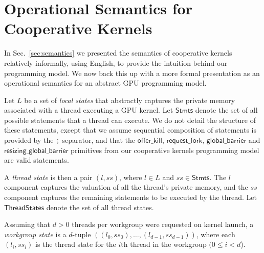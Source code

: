 \documentclass[sigconf]{acmart}
\newcommand{\mysec}{Sec.~}
\newcommand{\code}[1]{\lstset{basicstyle=\tt}\lstinline!#1!\lstset{basicstyle=\scriptsize\tt}}
\newcommand{\offerfork}{\mathsf{request\_fork}}
\newcommand{\offerkill}{\mathsf{offer\_kill}}
\newcommand{\globalbarrier}{\mathsf{global\_barrier}}
\newcommand{\resizingglobalbarrier}{\mathsf{resizing\_global\_barrier}}
\begin{document}
{%

\clearpage




\iffalse


\clearpage

\appendix

\section{Operational Semantics for Cooperative Kernels}\label{appendix:semantics}

\newcommand{\myss}{\mathit{ss}}
\newcommand{\Stmts}{\mathsf{Stmts}}
\newcommand{\threadstates}{\mathsf{ThreadStates}}
\newcommand{\sharedstates}{\mathsf{SharedStates}}
\newcommand{\sync}{\mathsf{sync}}

In \mysec\ref{sec:semantics} we presented the semantics of cooperative
kernels relatively informally, using English, to provide the intuition
behind our programming model.  We now back this up with a more formal
presentation as an operational semantics for an abstract GPU
programming model.

%
Let $L$ be a set of \emph{local states} that abstractly captures the
private memory associated with a thread executing a GPU kernel.  Let
$\Stmts$ denote the set of all possible statements that a
thread can execute.  We do not detail the structure of these
statements, except that we assume sequential composition of statements
is provided by the $\code{;}$ separator, and that the $\offerkill$,
$\offerfork$, $\globalbarrier$ and $\resizingglobalbarrier$ primitives
from our cooperative kernels programming model are valid statements.

A \emph{thread state} is then a pair $(l, \myss)$, where $l \in L$ and
$\myss \in \Stmts$.  The $l$ component captures the valuation of all the
thread's private memory, and the $\myss$ component captures the
remaining statements to be executed by the thread.  Let $\threadstates$ denote the set of all thread states.

Assuming that $d > 0$ threads per workgroup were requested on kernel launch, a \emph{workgroup state}
is a $d$-tuple $((l_0, \myss_0), \dots, (l_{d-1}, \myss_{d-1}))$, where each $(l_i, \myss_i)$ is the thread state for the $i$th thread in the workgroup $(0\leq i < d$).

}
\end{document}
